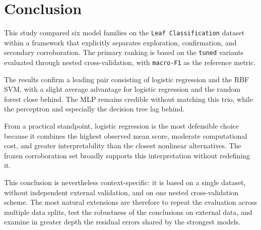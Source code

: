 \section{Conclusion}

This study compared six model families on the \texttt{Leaf Classification} dataset within a framework that explicitly separates exploration, confirmation, and secondary corroboration. The primary ranking is based on the \texttt{tuned} variants evaluated through nested cross-validation, with \texttt{macro-F1} as the reference metric.

The results confirm a leading pair consisting of logistic regression and the RBF SVM, with a slight average advantage for logistic regression and the random forest close behind. The MLP remains credible without matching this trio, while the perceptron and especially the decision tree lag behind.

From a practical standpoint, logistic regression is the most defensible choice because it combines the highest observed mean score, moderate computational cost, and greater interpretability than the closest nonlinear alternatives. The frozen corroboration set broadly supports this interpretation without redefining it.

This conclusion is nevertheless context-specific: it is based on a single dataset, without independent external validation, and on one nested cross-validation scheme. The most natural extensions are therefore to repeat the evaluation across multiple data splits, test the robustness of the conclusions on external data, and examine in greater depth the residual errors shared by the strongest models.

